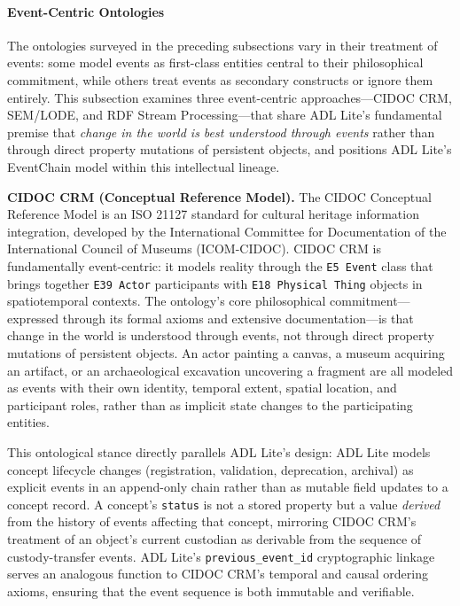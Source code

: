 \paragraph{Event-Centric Ontologies}\label{event-centric-ontologies}

The ontologies surveyed in the preceding subsections vary in their treatment of events: some model events as first-class entities central to their philosophical commitment, while others treat events as secondary constructs or ignore them entirely. This subsection examines three event-centric approaches---CIDOC CRM, SEM/LODE, and RDF Stream Processing---that share ADL Lite's fundamental premise that \emph{change in the world is best understood through events} rather than through direct property mutations of persistent objects, and positions ADL Lite's EventChain model within this intellectual lineage.

\textbf{CIDOC CRM (Conceptual Reference Model).} The CIDOC Conceptual Reference Model\cite{ref49} is an ISO 21127 standard for cultural heritage information integration, developed by the International Committee for Documentation of the International Council of Museums (ICOM-CIDOC). CIDOC CRM is fundamentally event-centric: it models reality through the \texttt{E5\ Event} class that brings together \texttt{E39\ Actor} participants with \texttt{E18\ Physical\ Thing} objects in spatiotemporal contexts. The ontology's core philosophical commitment---expressed through its formal axioms and extensive documentation---is that change in the world is understood through events, not through direct property mutations of persistent objects. An actor painting a canvas, a museum acquiring an artifact, or an archaeological excavation uncovering a fragment are all modeled as events with their own identity, temporal extent, spatial location, and participant roles, rather than as implicit state changes to the participating entities.

This ontological stance directly parallels ADL Lite's design: ADL Lite models concept lifecycle changes (registration, validation, deprecation, archival) as explicit events in an append-only chain rather than as mutable field updates to a concept record. A concept's \texttt{status} is not a stored property but a value \emph{derived} from the history of events affecting that concept, mirroring CIDOC CRM's treatment of an object's current custodian as derivable from the sequence of custody-transfer events. ADL Lite's \texttt{previous\_event\_id} cryptographic linkage serves an analogous function to CIDOC CRM's temporal and causal ordering axioms, ensuring that the event sequence is both immutable and verifiable.


